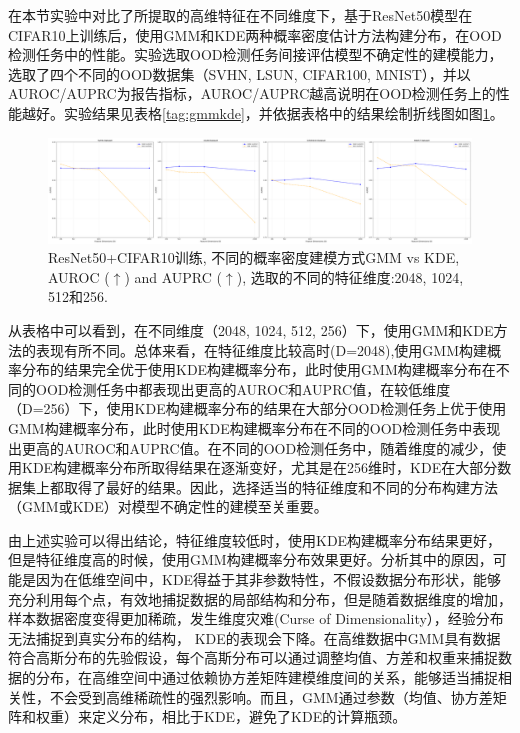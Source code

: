 在本节实验中对比了所提取的高维特征在不同维度下，基于ResNet50模型在CIFAR10上训练后，使用GMM和KDE两种概率密度估计方法构建分布，在OOD检测任务中的性能。实验选取OOD检测任务间接评估模型不确定性的建模能力，选取了四个不同的OOD数据集（SVHN, LSUN, CIFAR100, MNIST），并以AUROC/AUPRC为报告指标，AUROC/AUPRC越高说明在OOD检测任务上的性能越好。实验结果见表格\ref{tag:gmmkde}，并依据表格中的结果绘制折线图如图\ref{fig:gmmkde2}。
\begin{figure}[h]
    \captionsetup{font=small, justification=centering}
    \centering
    \includegraphics[width=0.9\linewidth]{assets/gmm_kde_dimension.png}
    \caption{ResNet50+CIFAR10训练, 不同的概率密度建模方式GMM vs KDE, AUROC ($\uparrow$) and AUPRC ($\uparrow$), 选取的不同的特征维度:2048, 1024, 512和256.}
    \label{fig:gmmkde2}
\end{figure}

从表格中可以看到，在不同维度（2048, 1024, 512, 256）下，使用GMM和KDE方法的表现有所不同。总体来看，在特征维度比较高时(D=2048),使用GMM构建概率分布的结果完全优于使用KDE构建概率分布，此时使用GMM构建概率分布在不同的OOD检测任务中都表现出更高的AUROC和AUPRC值，在较低维度（D=256）下，使用KDE构建概率分布的结果在大部分OOD检测任务上优于使用GMM构建概率分布，此时使用KDE构建概率分布在不同的OOD检测任务中表现出更高的AUROC和AUPRC值。在不同的OOD检测任务中，随着维度的减少，使用KDE构建概率分布所取得结果在逐渐变好，尤其是在256维时，KDE在大部分数据集上都取得了最好的结果。因此，选择适当的特征维度和不同的分布构建方法（GMM或KDE）对模型不确定性的建模至关重要。

由上述实验可以得出结论，特征维度较低时，使用KDE构建概率分布结果更好，但是特征维度高的时候，使用GMM构建概率分布效果更好。分析其中的原因，可能是因为在低维空间中，KDE得益于其非参数特性，不假设数据分布形状，能够充分利用每个点，有效地捕捉数据的局部结构和分布，但是随着数据维度的增加，样本数据密度变得更加稀疏，发生维度灾难(Curse of Dimensionality）\cite{murphy2012machine}，经验分布无法捕捉到真实分布的结构， KDE的表现会下降。在高维数据中GMM具有数据符合高斯分布的先验假设，每个高斯分布可以通过调整均值、方差和权重来捕捉数据的分布，在高维空间中通过依赖协方差矩阵建模维度间的关系，能够适当捕捉相关性，不会受到高维稀疏性的强烈影响。而且，GMM通过参数（均值、协方差矩阵和权重）来定义分布，相比于KDE，避免了KDE的计算瓶颈。 


